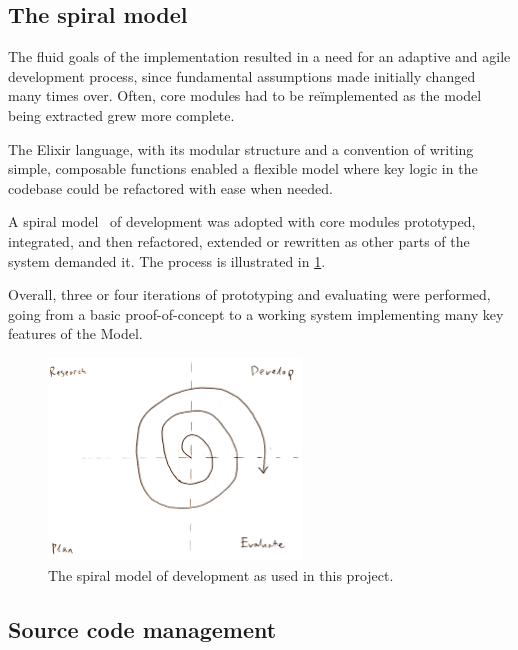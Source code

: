 \subsection{The spiral model}\label{sec:prep:softeng:spiral}

The fluid goals of the implementation resulted in a need for an adaptive and agile development process, since fundamental assumptions made initially changed many times over.
Often, core modules had to be re\"implemented as the model being extracted grew more complete.

The Elixir language, with its modular structure and a convention of writing simple, composable functions enabled a flexible model where key logic in the codebase could be refactored with ease when needed.

A spiral model~\cite{Boehm:1986} of development was adopted with core modules prototyped, integrated, and then refactored, extended or rewritten as other parts of the system demanded it.
The process is illustrated in \cref{fig:prep:spiral-model}.

Overall, three or four iterations of prototyping and evaluating were performed, going from a basic proof-of-concept to a working system implementing many key features of the Model.

\begin{figure}[h]
	\centering
	\includegraphics[width=0.6\textwidth]{images/temp/spiral}
	\caption{The spiral model of development as used in this project.}
	\label{fig:prep:spiral-model}
\end{figure}



\subsection{Source code management}\label{sec:prep:softeng:scm}

